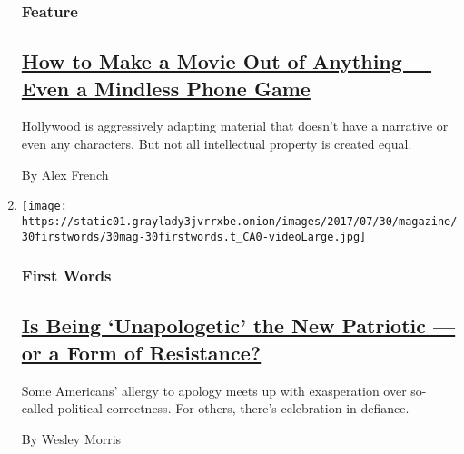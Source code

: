 \begin{enumerate}
  \hypertarget{feature-2}{%
  \subsubsection{Feature}\label{feature-2}}

  \hypertarget{how-to-make-a-movie-out-of-anything--even-a-mindless-phone-game}{%
  \subsection{\texorpdfstring{\href{/2017/07/27/magazine/why-hollywood-is-trying-to-turn-everything-into-movies-even-mindless-games-like-fruit-ninja.html}{How
  to Make a Movie Out of Anything --- Even a Mindless Phone
  Game}}{How to Make a Movie Out of Anything --- Even a Mindless Phone Game}}\label{how-to-make-a-movie-out-of-anything--even-a-mindless-phone-game}}

  Hollywood is aggressively adapting material that doesn't have a
  narrative or even any characters. But not all intellectual property is
  created equal.

  By Alex French
\item
  \texttt{[image: https://static01.graylady3jvrrxbe.onion/images/2017/07/30/magazine/30firstwords/30mag-30firstwords.t\_CA0-videoLarge.jpg]}

  \hypertarget{first-words}{%
  \subsubsection{First Words}\label{first-words}}

  \hypertarget{is-being-unapologetic-the-new-patriotic--or-a-form-of-resistance}{%
  \subsection{\texorpdfstring{\href{/2017/07/25/magazine/is-being-unapologetic-the-new-patriotic-or-a-form-of-resistance.html}{Is
  Being `Unapologetic' the New Patriotic --- or a Form of
  Resistance?}}{Is Being `Unapologetic' the New Patriotic --- or a Form of Resistance?}}\label{is-being-unapologetic-the-new-patriotic--or-a-form-of-resistance}}

  Some Americans' allergy to apology meets up with exasperation over
  so-called political correctness. For others, there's celebration in
  defiance.

  By Wesley Morris
\end{enumerate}

